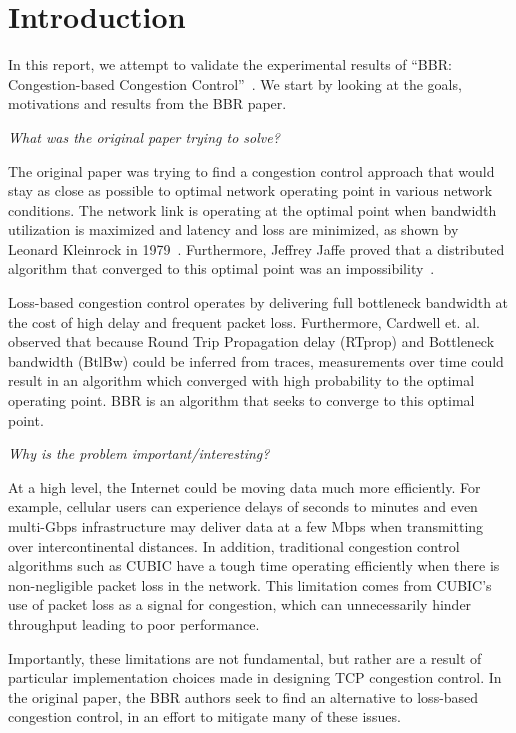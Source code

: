 
\section{Introduction}
In this report, we attempt to validate the experimental results of ``BBR:
Congestion-based Congestion Control''~\cite{cardwell2016bbr}. We start
by looking at the goals, motivations and results from the BBR paper.

\emph{What was the original paper trying to solve?}

The original paper was trying to find a congestion control approach
that would stay as close as possible to optimal network operating point
in various network conditions. The network link is operating at the optimal
point when bandwidth utilization is maximized and latency and loss are
minimized, as shown by Leonard Kleinrock in 1979~\cite{kleinrock1979power}.
Furthermore, Jeffrey Jaffe proved that a distributed algorithm that converged
to this optimal point was an impossibility~\cite{jaffe1981flow}.

Loss-based congestion control operates by delivering full
bottleneck bandwidth at the cost of high delay and frequent packet loss.
Furthermore, Cardwell et. al. observed that because Round Trip Propagation delay
(RTprop) and Bottleneck bandwidth (BtlBw) could be inferred from traces,
measurements over time could result in an algorithm which converged with
high probability to the optimal operating point. BBR is an algorithm that
seeks to converge to this optimal point.


\emph{Why is the problem important/interesting?}

At a high level, the Internet could be moving data much more efficiently.
For example, cellular users can experience delays of seconds to minutes and
even multi-Gbps infrastructure may deliver data at a few Mbps when transmitting
over intercontinental distances. In addition, traditional congestion control
algorithms such as CUBIC have a tough time operating efficiently when there
is non-negligible packet loss in the network. This limitation comes from
CUBIC's use of packet loss as a signal for congestion, which can unnecessarily
hinder throughput leading to poor performance.

Importantly, these limitations are not fundamental, but rather are a result
of particular implementation choices made in designing TCP congestion control.
In the original paper, the BBR authors seek to find an alternative to loss-based
congestion control, in an effort to mitigate many of these issues.

